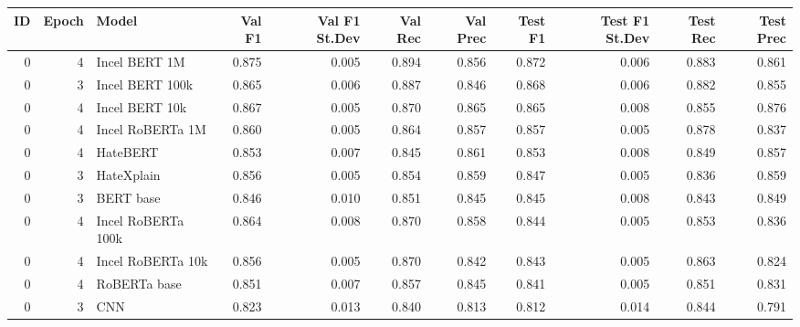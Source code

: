 \begin{tabular}{rrlrrrrrrrr}
\toprule
 ID &  Epoch &              Model &  Val F1 &  Val F1 St.Dev &  Val Rec &  Val Prec &  Test F1 &  Test F1 St.Dev &  Test Rec &  Test Prec \\
\midrule
  0 &      4 &      Incel BERT 1M &   0.875 &          0.005 &    0.894 &     0.856 &    0.872 &           0.006 &     0.883 &      0.861 \\
  0 &      3 &    Incel BERT 100k &   0.865 &          0.006 &    0.887 &     0.846 &    0.868 &           0.006 &     0.882 &      0.855 \\
  0 &      4 &     Incel BERT 10k &   0.867 &          0.005 &    0.870 &     0.865 &    0.865 &           0.008 &     0.855 &      0.876 \\
  0 &      4 &   Incel RoBERTa 1M &   0.860 &          0.005 &    0.864 &     0.857 &    0.857 &           0.005 &     0.878 &      0.837 \\
  0 &      4 &           HateBERT &   0.853 &          0.007 &    0.845 &     0.861 &    0.853 &           0.008 &     0.849 &      0.857 \\
  0 &      3 &         HateXplain &   0.856 &          0.005 &    0.854 &     0.859 &    0.847 &           0.005 &     0.836 &      0.859 \\
  0 &      3 &          BERT base &   0.846 &          0.010 &    0.851 &     0.845 &    0.845 &           0.008 &     0.843 &      0.849 \\
  0 &      4 & Incel RoBERTa 100k &   0.864 &          0.008 &    0.870 &     0.858 &    0.844 &           0.005 &     0.853 &      0.836 \\
  0 &      4 &  Incel RoBERTa 10k &   0.856 &          0.005 &    0.870 &     0.842 &    0.843 &           0.005 &     0.863 &      0.824 \\
  0 &      4 &       RoBERTa base &   0.851 &          0.007 &    0.857 &     0.845 &    0.841 &           0.005 &     0.851 &      0.831 \\
  0 &      3 &                CNN &   0.823 &          0.013 &    0.840 &     0.813 &    0.812 &           0.014 &     0.844 &      0.791 \\
\bottomrule
\end{tabular}
